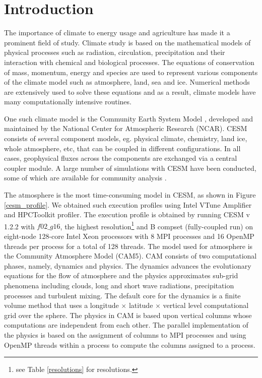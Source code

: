 \section{Introduction}
\label{intro}

The importance of climate to energy usage and agriculture has made it a prominent field of study. Climate study is based on the mathematical models of physical processes such as radiation, circulation, precipitation and their interaction with chemical and biological processes. The equations of conservation of mass, momentum, energy and species are used to represent various components of the climate model such as atmosphere, land, sea and ice. Numerical methods are extensively used to solve these equations and as a result, climate models have many computationally intensive routines.

One  such  climate  model is the Community Earth System Model \cite{hurrell-cesm-bams2013}, developed and maintained by the National Center for Atmospheric Research (NCAR). CESM consists of several component models, eg. physical climate, chemistry, land ice, whole atmosphere, etc, that can be coupled in different configurations. In all cases, geophysical fluxes across the components are exchanged via a central coupler module. A large number of simulations with CESM have been conducted, some of which are available for community analysis \cite{hurrell-cesm-bams2013}.

The atmosphere is the most time-consuming model in CESM, as shown in Figure \ref{cesm_profile}.  We obtained such execution profiles using Intel VTune Amplifier and HPCToolkit profiler\cite{hpctoolkit}. The execution profile is obtained by running CESM v 1.2.2 with $f02\_g16$, the highest resolution\footnote{see Table \ref{resolutions} for resolutions.} and B compset (fully-coupled run) on eight-node 128-core Intel Xeon processors with 8 MPI processes and 16 OpenMP threads per process for a total of 128 threads. The model used for atmosphere is the Community Atmosphere Model (CAM5)\cite{collins-cam-jc2006,neale-meanclimate-jc2013}. CAM consists of two computational phases, namely, dynamics and physics. The dynamics advances the evolutionary equations for the flow of atmosphere and the physics approximates sub-grid phenomena including clouds, long and short wave radiations, precipitation processes and turbulent mixing. The default core for the dynamics is a finite volume method \cite{neale-meanclimate-jc2013} that uses a longitude $\times$  latitude $\times$ vertical level computational grid over the sphere. The physics in CAM is based upon vertical columns whose computations are independent from each other. The parallel implementation of the physics is based on the assignment of columns to MPI processes and using OpenMP threads within a process to compute the columns assigned to a process.

